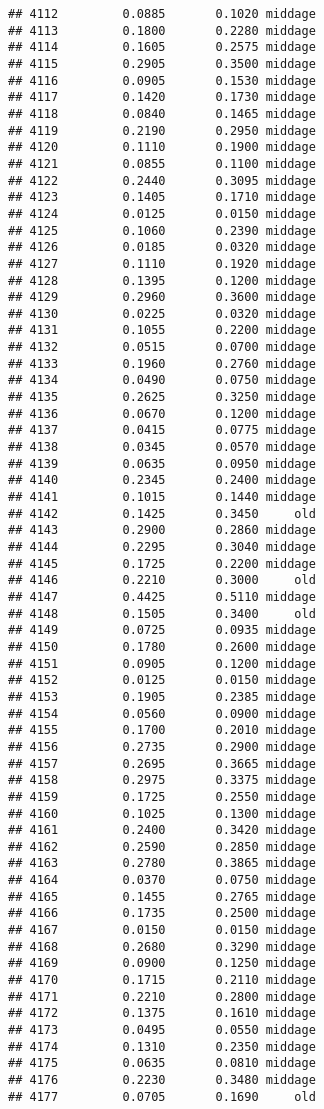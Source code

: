 \documentclass[
]{article}
\begin{document}
\begin{verbatim}
## 4112         0.0885       0.1020 middage
## 4113         0.1800       0.2280 middage
## 4114         0.1605       0.2575 middage
## 4115         0.2905       0.3500 middage
## 4116         0.0905       0.1530 middage
## 4117         0.1420       0.1730 middage
## 4118         0.0840       0.1465 middage
## 4119         0.2190       0.2950 middage
## 4120         0.1110       0.1900 middage
## 4121         0.0855       0.1100 middage
## 4122         0.2440       0.3095 middage
## 4123         0.1405       0.1710 middage
## 4124         0.0125       0.0150 middage
## 4125         0.1060       0.2390 middage
## 4126         0.0185       0.0320 middage
## 4127         0.1110       0.1920 middage
## 4128         0.1395       0.1200 middage
## 4129         0.2960       0.3600 middage
## 4130         0.0225       0.0320 middage
## 4131         0.1055       0.2200 middage
## 4132         0.0515       0.0700 middage
## 4133         0.1960       0.2760 middage
## 4134         0.0490       0.0750 middage
## 4135         0.2625       0.3250 middage
## 4136         0.0670       0.1200 middage
## 4137         0.0415       0.0775 middage
## 4138         0.0345       0.0570 middage
## 4139         0.0635       0.0950 middage
## 4140         0.2345       0.2400 middage
## 4141         0.1015       0.1440 middage
## 4142         0.1425       0.3450     old
## 4143         0.2900       0.2860 middage
## 4144         0.2295       0.3040 middage
## 4145         0.1725       0.2200 middage
## 4146         0.2210       0.3000     old
## 4147         0.4425       0.5110 middage
## 4148         0.1505       0.3400     old
## 4149         0.0725       0.0935 middage
## 4150         0.1780       0.2600 middage
## 4151         0.0905       0.1200 middage
## 4152         0.0125       0.0150 middage
## 4153         0.1905       0.2385 middage
## 4154         0.0560       0.0900 middage
## 4155         0.1700       0.2010 middage
## 4156         0.2735       0.2900 middage
## 4157         0.2695       0.3665 middage
## 4158         0.2975       0.3375 middage
## 4159         0.1725       0.2550 middage
## 4160         0.1025       0.1300 middage
## 4161         0.2400       0.3420 middage
## 4162         0.2590       0.2850 middage
## 4163         0.2780       0.3865 middage
## 4164         0.0370       0.0750 middage
## 4165         0.1455       0.2765 middage
## 4166         0.1735       0.2500 middage
## 4167         0.0150       0.0150 middage
## 4168         0.2680       0.3290 middage
## 4169         0.0900       0.1250 middage
## 4170         0.1715       0.2110 middage
## 4171         0.2210       0.2800 middage
## 4172         0.1375       0.1610 middage
## 4173         0.0495       0.0550 middage
## 4174         0.1310       0.2350 middage
## 4175         0.0635       0.0810 middage
## 4176         0.2230       0.3480 middage
## 4177         0.0705       0.1690     old
\end{verbatim}
\end{document}
